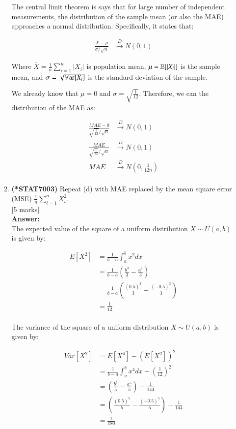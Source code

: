 \documentclass[12pt]{article}
\begin{document}
\begin{enumerate}
\begin{enumerate}
The central limit theorem is says that for large number of independent measurements, the distribution of the sample mean (or also the MAE) approaches a normal distribution. Specifically, it states that:

\begin{align*}
\frac{\bar{X} - \mu}{\sigma/\sqrt{n}} &\xrightarrow{D} N(0, 1)
\end{align*}

Where $\bar{X} = \frac{1}{n} \sum_{i=1}^n |X_i|$ is population mean, $\mu = {\mathbb E}[|X_i|]$ is the sample mean, and $\sigma = \sqrt{\mathbb{V}\mathrm{ar}[X_i]}$ is the standard deviation of the sample.

We already know that $\mu = 0$ and $\sigma = \sqrt{\frac{1}{12}}$. Therefore, we can the distribution of the MAE as:

\begin{align*}
\frac{MAE - 0}{\sqrt{\frac{1}{12}}/\sqrt{n}} &\xrightarrow{D} N(0, 1) \\
\frac{MAE}{\sqrt{\frac{1}{12}}/\sqrt{n}} &\xrightarrow{D} N(0, 1) \\
MAE &\xrightarrow{D} N\left(0, \frac{1}{12n}\right) \\
\end{align*}
%

\item 
{\bf (*STAT7003)} Repeat (d) with MAE replaced by the mean square error (MSE) $\frac{1}{n} \sum_{i=1}^n X_i^2$. 
			\\\phantom{1}\hfill [5 marks]
%
\\
\textbf{Answer:}
\\
The expected value of the square of a uniform distribution $X \sim U(a, b)$ is given by:

\begin{align*}
E[X^2] &= \frac{1}{b-a} \int_a^b x^2 dx \\
&= \frac{1}{b-a} \left(\frac{b^3}{3} - \frac{a^3}{3}\right) \\
&= \frac{1}{b-a} \left(\frac{(0.5)^3}{3} - \frac{(-0.5)^3}{3}\right) \\
&= \frac{1}{12} \\
\end{align*}

The variance of the square of a uniform distribution $X \sim U(a, b)$ is given by:

\begin{align*}
Var[X^2] &= E[X^4] - (E[X^2])^2 \\
&= \frac{1}{b-a} \int_a^b x^4 dx - \left(\frac{1}{12}\right)^2 \\
&= \left(\frac{b^5}{5} - \frac{a^5}{5}\right) - \frac{1}{144} \\
&= \left(\frac{(0.5)^5}{5} - \frac{(-0.5)^5}{5}\right) - \frac{1}{144} \\
&= \frac{1}{180}
\end{align*}


\end{enumerate}
\end{enumerate}
\end{document}
